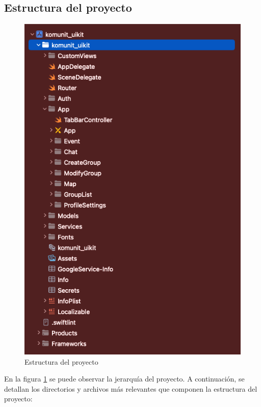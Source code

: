 \subsection{Estructura del proyecto}
\begin{figure}[H]
        \centering
        \includegraphics[width=0.66\linewidth]{images/manual/estructuraDelProyecto.png}
        \caption{Estructura del proyecto}
        \label{fig:estructuraProyecto}
\end{figure}
En la figura \ref{fig:estructuraProyecto} se puede observar la jerarquía del proyecto. A continuación, se detallan los directorios y archivos más relevantes que componen la estructura del proyecto:

